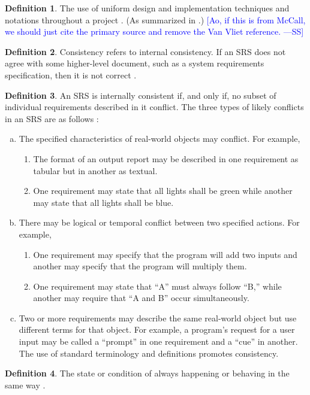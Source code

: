 \documentclass[letterpaper,cleveref]{lipics-v2019}
\newcommand{\authornote}[3]{\textcolor{#1}{[#3 ---#2]}}
\newcommand{\authornote}[3]{}
\newcommand{\wss}[1]{\authornote{blue}{SS}{#1}} %
\theoremstyle{definition}
\newtheorem{defn}{Definition}
\begin{document}
\begin{defn}
  The use of uniform design and implementation techniques and notations
  throughout a project \citep{McCallEtAl1977}. (As summarized in
  \citet{VanVliet2000}.)  \wss{Ao, if this is from McCall, we should just cite
    the primary source and remove the Van Vliet reference.}
\end{defn}

\begin{defn}
Consistency refers to internal consistency. If an SRS does not agree with some
higher-level document, such as a system requirements specification, then it is
not correct \citep{IEEE1998}.
\end{defn}
\begin{defn}
An SRS is internally consistent if, and only if, no subset of individual
requirements described in it conflict. The three types of likely conflicts in an
SRS are as follows \citep{IEEE1998}:
	\begin{enumerate}[a)]
\item The specified characteristics of real-world objects may conflict. For
example,
	\begin{enumerate}[1)]
\item The format of an output report may be described in one requirement as
tabular but in another as textual.
\item One requirement may state that all lights shall be green while another may
state that all lights shall be blue.
	\end{enumerate}
\item There may be logical or temporal conflict between two specified actions.
For example,
	\begin{enumerate}[1)]
\item One requirement may specify that the program will add two inputs and
another may specify that the program will multiply them.
\item One requirement may state that “A” must always follow “B,” while another
may require that “A and B” occur simultaneously.
	\end{enumerate}
\item Two or more requirements may describe the same real-world object but use
different terms for that object. For example, a program’s request for a user
input may be called a “prompt” in one requirement and a “cue” in another. The
use of standard terminology and definitions promotes consistency.
	\end{enumerate}
\end{defn}
\begin{defn}
The state or condition of always happening or behaving in the same way
\citep{CambridgeConsistency2019}.
\end{defn}
\end{document}
